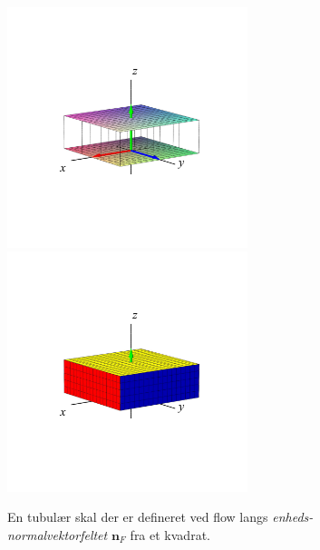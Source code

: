 
\begin{figure}[h]
\centerline{\includegraphics[height=70mm]{FIGS/plotNormalKvadratFlow} \includegraphics[height=70mm]{FIGS/plotNormalKvadratFlowSolid}}
\begin{center}
\caption{En tubulær skal der er defineret ved flow langs  \emph{enheds-normalvektorfeltet} $\mathbf{n}_{F}$
fra et
kvadrat.} \label{figShell12A}
\end{center}
\end{figure}


